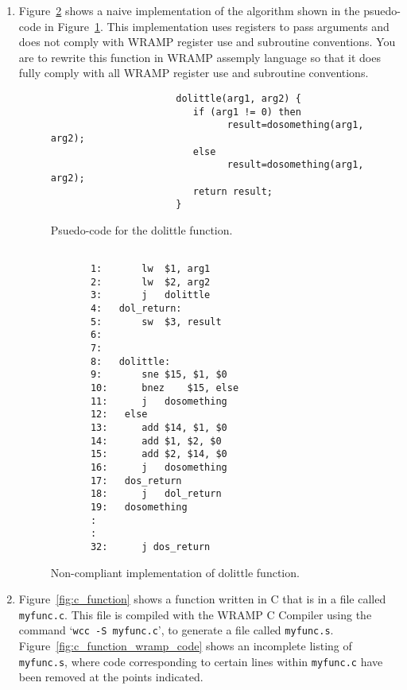 \documentclass[a4paper,10pt]{article}
\begin{document}
\begin{enumerate}
\newpage

\item Figure~\ref{fig:non_dolittle} shows a naive implementation of the algorithm shown in the psuedo-code in Figure~\ref{fig:dolittle_psuedocode}.  This implementation uses registers to pass arguments and does not comply with WRAMP register use and subroutine conventions.  You are to rewrite this function in WRAMP assemply language so that it does fully comply with all WRAMP register use and subroutine conventions.

\begin{figure}[h]
{\small
\begin{center}
\begin{verbatim}
                      dolittle(arg1, arg2) {
                         if (arg1 != 0) then
                               result=dosomething(arg1, arg2);
                         else
                               result=dosomething(arg1, arg2);
                         return result;
                      }
\end{verbatim}
\end{center}
} 
\caption{Psuedo-code for the dolittle function.}
\label{fig:dolittle_psuedocode}
\end{figure}

\begin{figure}[h]
{\small
\begin{center}
\begin{verbatim}

       1:   	lw 	$1, arg1
       2:   	lw	$2, arg2
       3:   	j	dolittle
       4:   dol_return:
       5:   	sw	$3, result
       6:
       7:
       8:   dolittle:
       9:   	sne	$15, $1, $0
       10:   	bnez	$15, else
       11:   	j	dosomething
       12:   else
       13:   	add	$14, $1, $0
       14:   	add	$1, $2, $0
       15:   	add	$2, $14, $0
       16:   	j	dosomething
       17:   dos_return
       18:   	j	dol_return
       19:   dosomething
       : 
       :
       32:   	j dos_return
\end{verbatim}
\end{center}
} 
\caption{Non-compliant implementation of dolittle function.}
\label{fig:non_dolittle}
\end{figure}


\newpage



\item Figure~\ref{fig:c_function} shows a function written in C that is in a file called \texttt{myfunc.c}. This file is compiled with the WRAMP C Compiler using the command `\texttt{wcc -S myfunc.c}', to generate a file called \texttt{myfunc.s}.
Figure~\ref{fig:c_function_wramp_code} shows an incomplete listing of \texttt{myfunc.s}, where code corresponding to certain lines
within \texttt{myfunc.c} have been removed at the points indicated.


\end{enumerate}
\end{document}
